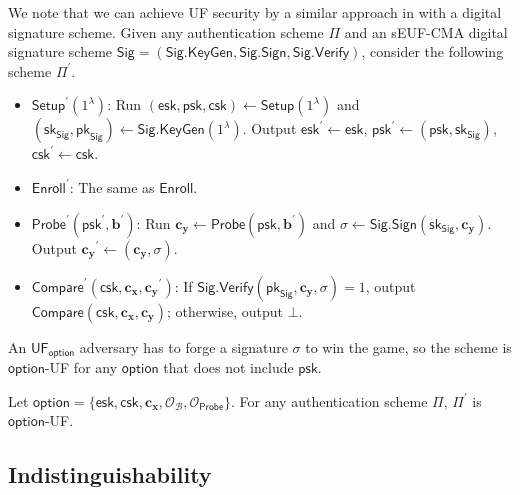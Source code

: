 We note that we can achieve UF security by a similar approach in \cite{cryptoeprint:2023/481} with a digital signature scheme. Given any authentication scheme $\Pi$ and an sEUF-CMA digital signature scheme $\textsf{Sig} = (\textsf{Sig.KeyGen}, \textsf{Sig.Sign}, \textsf{Sig.Verify})$, consider the following scheme $\Pi^\prime$.

\begin{itemize}

	\item $\textsf{Setup}^\prime (1^\lambda)$: Run $(\textsf{esk}, \textsf{psk}, \textsf{csk}) \gets \textsf{Setup}(1^\lambda)$ and $(\textsf{sk}_{\textsf{Sig}}, \textsf{pk}_{\textsf{Sig}}) \gets \textsf{Sig.KeyGen}(1^\lambda)$. Output $\textsf{esk}^\prime \gets \textsf{esk}$, $\textsf{psk}^\prime \gets (\textsf{psk}, \textsf{sk}_{\textsf{Sig}})$, $\textsf{csk}^\prime \gets \textsf{csk}$.

	\item $\textsf{Enroll}^\prime$: The same as $\textsf{Enroll}$.

	\item $\textsf{Probe}^\prime (\textsf{psk}^\prime, \mathbf{b}^\prime)$: Run $\mathbf{c_y} \gets \textsf{Probe}(\textsf{psk}, \mathbf{b}^\prime)$ and $\sigma \gets \textsf{Sig.Sign}(\textsf{sk}_{\textsf{Sig}}, \mathbf{c_y})$. Output $\mathbf{c_y}^\prime \gets (\mathbf{c_y}, \sigma)$.

	\item $\textsf{Compare}^\prime (\textsf{csk}, \mathbf{c_x}, \mathbf{c_y}^\prime)$: If $\textsf{Sig.Verify}(\textsf{pk}_{\textsf{Sig}}, \mathbf{c_y}, \sigma) = 1$, output $\textsf{Compare}(\textsf{csk}, \mathbf{c_x}, \mathbf{c_y})$; otherwise, output $\bot$.

\end{itemize}

An $\textsf{UF}_\textsf{option}$ adversary has to forge a signature $\sigma$ to win the game, so the scheme is $\textsf{option}$-UF for any $\textsf{option}$ that does not include $\textsf{psk}$. 

\begin{theorem}
\label{thm:sEUF-CMA-esk-csk}
	Let $\textsf{option} = \{ \textsf{esk}, \textsf{csk}, \mathbf{c_x}, \mathcal{O}_\mathcal{B}, \mathcal{O}_{\textsf{Probe}} \}$. For any authentication scheme $\Pi$, $\Pi^\prime$ is $\textsf{option}$-UF. 
\end{theorem}



\subsection{Indistinguishability}
\label{sec:ind_game}

